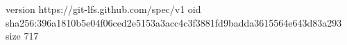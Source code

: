 version https://git-lfs.github.com/spec/v1
oid sha256:396a1810b5e04f06ced2e5153a3acc4c3f3881fd9badda3615564e643d83a293
size 717
